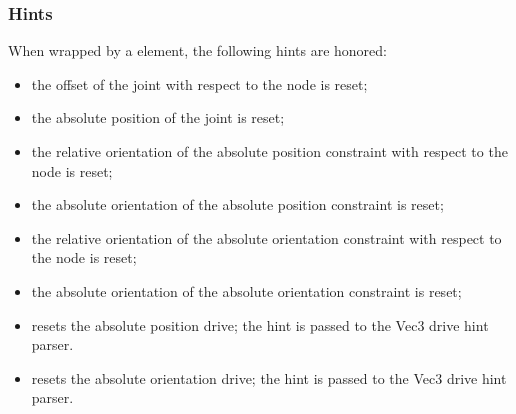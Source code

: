 \subsubsection{Hints}
When wrapped by a  element, the following hints are honored:
\begin{itemize}
\item {} the offset of the joint
with respect to the node is reset;
\item {} the absolute position of the joint
is reset;
\item {} the relative orientation
of the absolute position constraint with respect to the node is reset;
\item {} the absolute orientation 
of the absolute position constraint is reset;
\item {} the relative orientation
of the absolute orientation constraint with respect to the node is reset;
\item {} the absolute orientation 
of the absolute orientation constraint is reset;
\item {} resets the absolute position drive;
the hint is passed to the Vec3 drive hint parser.
\item {} resets the absolute orientation drive;
the hint is passed to the Vec3 drive hint parser.
\end{itemize}



